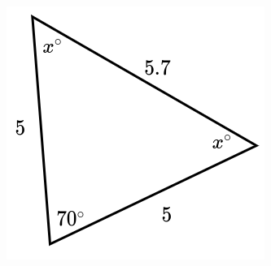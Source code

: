 \begin{minipage}[t][][t]{0.6\textwidth}
    \begin{solutionbox}{8cm}
        \begin{minipage}{0.9\linewidth}
            \begin{figure}[H]
                \centering
                \includegraphics[width=0.9\linewidth]{../images/findangle10a.png}
                \caption{}
                \label{fig:findangle10a}
            \end{figure}
        \end{minipage}\hfill
        \begin{minipage}{0.65\textwidth}

        \end{minipage}
    \end{solutionbox}
\end{minipage}
